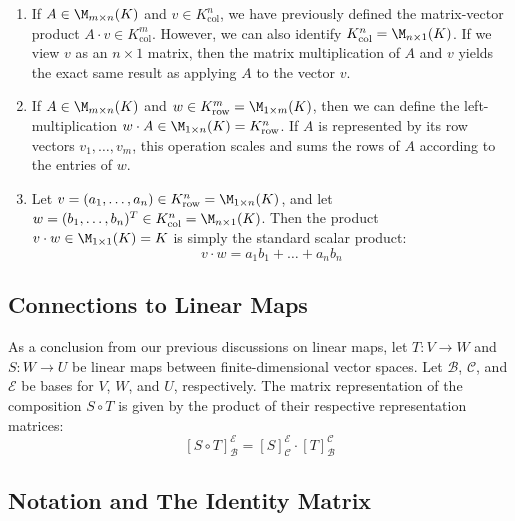 \begin{enumerate}
    \item If $A \in \M_{m \times n}(K)$ and $v \in K_{\text{col}}^{n}$, we have previously defined the matrix-vector product $A \cdot v \in K_{\text{col}}^{m}$. However, we can also identify $K_{\text{col}}^{n} = \M_{n \times 1}(K)$. If we view $v$ as an $n \times 1$ matrix, then the matrix multiplication of $A$ and $v$ yields the exact same result as applying $A$ to the vector $v$.
    
    \item If $A \in \M_{m \times n}(K)$ and $w \in K_{\text{row}}^{m} = \M_{1 \times m}(K)$, then we can define the left-multiplication $w \cdot A \in \M_{1 \times n}(K) = K_{\text{row}}^{n}$. If $A$ is represented by its row vectors $v_1, \dots, v_m$, this operation scales and sums the rows of $A$ according to the entries of $w$.
    
    \item Let $v = (a_1, \dots, a_n) \in K_{\text{row}}^{n} = \M_{1 \times n}(K)$, and let $w = (b_1, \dots, b_n)^T \in K_{\text{col}}^{n} = \M_{n \times 1}(K)$. Then the product $v \cdot w \in \M_{1 \times 1}(K) = K$ is simply the standard scalar product:
    \begin{equation*}
        v \cdot w = a_1 b_1 + \dots + a_n b_n
    \end{equation*}
\end{enumerate}

\subsection{Connections to Linear Maps}

As a conclusion from our previous discussions on linear maps, let $T: V \to W$ and $S: W \to U$ be linear maps between finite-dimensional vector spaces. Let $\mathcal{B}$, $\mathcal{C}$, and $\mathcal{E}$ be bases for $V$, $W$, and $U$, respectively. The matrix representation of the composition $S \circ T$ is given by the product of their respective representation matrices:
\[
    [S \circ T]_{\mathcal{B}}^{\mathcal{E}} = [S]_{\mathcal{C}}^{\mathcal{E}} \cdot [T]_{\mathcal{B}}^{\mathcal{C}}
\]

\subsection{Notation and The Identity Matrix}

